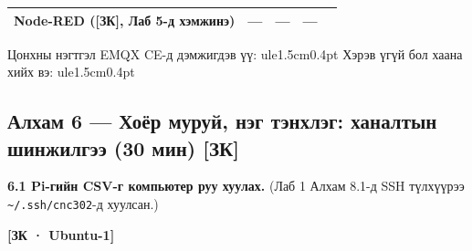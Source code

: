 \begin{longtable}[]{@{}lllll@{}}
\begin{minipage}[t]{0.17\columnwidth}\raggedright
Node-RED ({[}ЗК{]}, Лаб 5-д хэмжинэ)\strut
\end{minipage} & \begin{minipage}[t]{0.17\columnwidth}\raggedright
---\strut
\end{minipage} & \begin{minipage}[t]{0.17\columnwidth}\raggedright
---\strut
\end{minipage} & \begin{minipage}[t]{0.17\columnwidth}\raggedright
---\strut
\end{minipage} & \begin{minipage}[t]{0.17\columnwidth}\raggedright
\strut
\end{minipage}\tabularnewline
\bottomrule
\end{longtable}\endgroup

Цонхны нэгтгэл EMQX CE-д дэмжигдэв үү: ule{1.5cm}{0.4pt} Хэрэв үгүй бол хаана хийх вэ: ule{1.5cm}{0.4pt}

\hypertarget{ux430ux43bux445ux430ux43c-6-ux445ux43eux451ux440-ux43cux443ux440ux443ux439-ux43dux44dux433-ux442ux44dux43dux445ux43bux44dux433-ux445ux430ux43dux430ux43bux442ux44bux43d-ux448ux438ux43dux436ux438ux43bux433ux44dux44d-30-ux43cux438ux43d-ux437ux43a}{%
\subsection{Алхам 6 --- Хоёр муруй, нэг тэнхлэг: ханалтын шинжилгээ (30 мин) {[}ЗК{]}}\label{ux430ux43bux445ux430ux43c-6-ux445ux43eux451ux440-ux43cux443ux440ux443ux439-ux43dux44dux433-ux442ux44dux43dux445ux43bux44dux433-ux445ux430ux43dux430ux43bux442ux44bux43d-ux448ux438ux43dux436ux438ux43bux433ux44dux44d-30-ux43cux438ux43d-ux437ux43a}}

\textbf{6.1 Pi-гийн CSV-г компьютер руу хуулах.} (Лаб 1 Алхам 8.1-д SSH түлхүүрээ \texttt{\textasciitilde{}/.ssh/cnc302}-д хуулсан.)

\textbf{{[}ЗК · Ubuntu-1{]}}

\begin{Shaded}
\begin{Highlighting}[]
 \KeywordTok{\textbackslash{}}
     
\end{Highlighting}
\end{Shaded}

